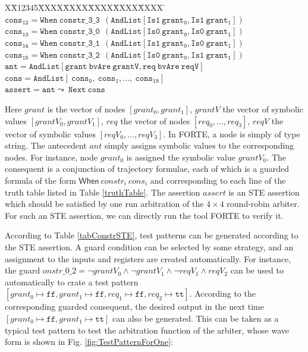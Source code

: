 \documentclass[final]{IEEEtran}
\newlength{\fminilength}
\newenvironment{fmini}[1][\linewidth]
  {\setlength{\fminilength}{#1\fboxsep-2\fboxrule}%
   \vspace{2ex}\noindent\begin{lrbox}{\fminibox}\begin{minipage}{\fminilength}%
   \mbox{ }\hfill\vspace{-2.5ex}}%
  {\end{minipage}\end{lrbox}\vspace{1ex}\hspace{0ex}%
   \framebox{\usebox{\fminibox}}}
\newenvironment{specification}
{\noindent\footnotesize\tt\begin{fmini}\begin{tabbing}X\=X12345\=XXXX\=XXXX\=XXXX\=XXXX\=XXXX
\=\+\kill} {\end{tabbing}\normalfont\end{fmini}}
\begin{document}
\begin{center}
\begin{table}
\begin{specification}
$\mathtt{cons_{12}=When\ constr\_3\_3\   \ ( AndList [Is1\  grant_0,Is1\  grant_1])}$\\

$\mathtt{cons_{13}=When\ constr\_3\_0\   \ (AndList [Is0\
grant_0,Is0\
grant_1])}$\\

$\mathtt{cons_{14}=When\ constr\_3\_1\   \ ( AndList
[Is1\  grant_0,Is0\  grant_1])}$\\

$\mathtt{cons_{15}=When\ constr\_3\_2\
   \ (AndList [Is0\  grant_0,Is1\  grant_1])}$\\

$\mathtt{ant=AndList [grant\ bvAre\ grantV,req\ bvAre\ reqV]}$\\

$\mathtt{cons= AndList [ \ cons_0,  \ cons_1,..., \ cons_{15}]}$\\

$\mathtt{assert=ant \leadsto \ Next\ cons}$\\



\end{specification}
\end{table}
\end{center}


Here   $grant$ is the vector of nodes  $[grant_0,grant_1]$, $grantV$
the vector of symbolic values $[grantV_0,grantV_1]$, $req$ the vector
of nodes  $[req_0,...,req_3]$, $reqV$ the vector of symbolic values
$[reqV_0,...,reqV_3]$. In FORTE, a node is simply of type string.
The antecedent $ant$ simply assigns symbolic values to the
corresponding nodes. For instance, node $grant_0$ is assigned the
symbolic value $grantV_0$. The consequent is a conjunction of
trajectory formulae, each of which is a guarded formula of the form
$\mathsf{When} \ constr_i \ cons_i$ and corresponding to each line
of the truth table listed in Table \ref{truthTable}. The assertion
$assert$ is an STE assertion which should be satisfied by one run
arbitration of the $4 \times 4$ round-robin
 arbiter. For such an STE assertion, we can directly run the tool
 FORTE to verify it.

 According to Table \ref{tabConstrSTE}, test patterns can be
 generated according to the STE assertion. A
 guard condition can be selected by some strategy, and an assignment
  to the inputs and registers are created automatically. For
  instance,  the guard  $onstr\_0\_2 =   \neg grantV_0\wedge \neg grantV_1\wedge \neg reqV_1 \wedge reqV_2$ can be used to automatically
to crate a test pattern $[grant_0 \mapsto \mathtt{ff},
grant_1\mapsto \mathtt{ff}, req_1\mapsto \mathtt{ff}, req_2\mapsto
\mathtt{tt}]$. According to the corresponding guarded consequent,
the desired output in the next time $[ grant_0 \mapsto \mathtt{ff} ,
grant_1 \mapsto \mathtt{tt}]$ can also be generated. This can be
taken as a typical test pattern to test the arbitration function of
the arbiter, whose wave form is shown in Fig.
\ref{fig:TestPatternForOne}:
\end{document}
